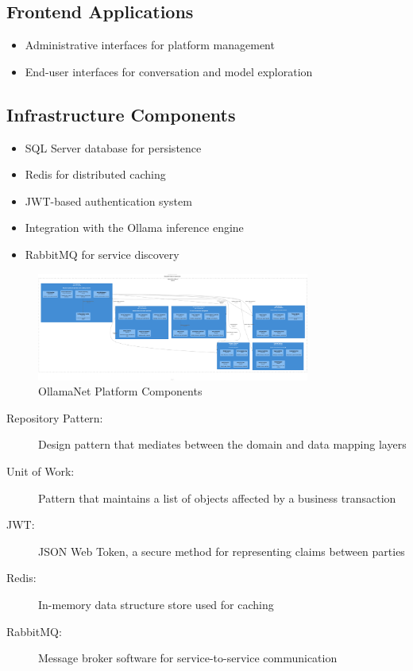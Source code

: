\subsection{Frontend Applications}
\begin{itemize}
    \item Administrative interfaces for platform management
    \item End-user interfaces for conversation and model exploration
\end{itemize}

\subsection{Infrastructure Components}
\begin{itemize}
    \item SQL Server database for persistence
    \item Redis for distributed caching
    \item JWT-based authentication system
    \item Integration with the Ollama inference engine
    \item RabbitMQ for service discovery
\end{itemize}

\begin{figure}
    \centering
    \includegraphics[width=0.8\textwidth]{./Chapter01/figures/OllamaNet_Platform_Components.png}
    \caption{OllamaNet Platform Components}
    \label{fig:ollamanet-platform-components}
\end{figure}

\begin{terminology}
\begin{description}
    \item[Repository Pattern:] Design pattern that mediates between the domain and data mapping layers
    \item[Unit of Work:] Pattern that maintains a list of objects affected by a business transaction
    \item[JWT:] JSON Web Token, a secure method for representing claims between parties
    \item[Redis:] In-memory data structure store used for caching
    \item[RabbitMQ:] Message broker software for service-to-service communication
\end{description}
\end{terminology}


